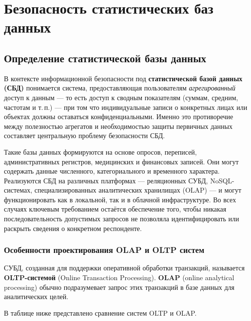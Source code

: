 \section{Безопасность статистических баз данных}
\subsection{Определение статистической базы данных}
В контексте информационной безопасности под \textbf{статистической базой данных (СБД)} понимается система, предоставляющая
пользователям \textit{агрегированный} доступ к данным — то есть доступ к сводным показателям (суммам, средним,
частотам и т.\,п.) — при том что индивидуальные записи о конкретных лицах или объектах должны оставаться
конфиденциальными. Именно это противоречие между полезностью агрегатов и необходимостью защиты первичных данных
составляет центральную проблему безопасности СБД.

Такие базы данных формируются на основе опросов, переписей, административных регистров, медицинских и финансовых
записей. Они могут содержать данные численного, категориального и временного характера. Реализуются СБД на различных
платформах — реляционных СУБД, NoSQL-системах, специализированных аналитических хранилищах (OLAP) — и могут
функционировать как в локальной, так и в облачной инфраструктуре. Во всех случаях ключевым требованием остаётся
обеспечение того, чтобы никакая последовательность допустимых запросов не позволяла идентифицировать или раскрыть
сведения о конкретном респонденте.

\subsubsection{Особенности проектирования OLAP и OLTP систем}

СУБД, созданная для поддержки оперативной обработки транзакций,
называется \textbf{OLTP-системой} (Online Transaction Processing). \textbf{OLAP} (online analytical processing) обычно подразумевает запрос этих транзакций в базе данных для аналитических целей. 

В таблице ниже представлено сравнение систем OLTP и OLAP\autocite{oracle_OLTP}.

